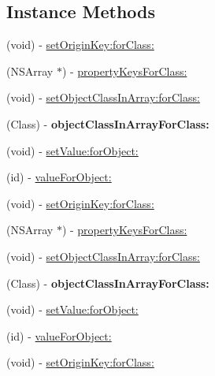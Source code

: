 \subsection*{Instance Methods}
\begin{DoxyCompactItemize}
\item 
(void) -\/ \mbox{\hyperlink{interface_m_j_property_ab05736d1d7501a6c7b686809bcd49a1c}{set\+Origin\+Key\+:for\+Class\+:}}
\item 
(N\+S\+Array $\ast$) -\/ \mbox{\hyperlink{interface_m_j_property_a0bb60a4e43e9c08eb17f9711c3313690}{property\+Keys\+For\+Class\+:}}
\item 
(void) -\/ \mbox{\hyperlink{interface_m_j_property_a79178c65fd4d34bdf5199bc7775ae5cd}{set\+Object\+Class\+In\+Array\+:for\+Class\+:}}
\item 
\mbox{\label{interface_m_j_property_ad41010eb106e4b2cd772da61abacad62}} 
(Class) -\/ {\bfseries object\+Class\+In\+Array\+For\+Class\+:}
\item 
(void) -\/ \mbox{\hyperlink{interface_m_j_property_a8d2eda5c6273d8346ac9de23a213afd2}{set\+Value\+:for\+Object\+:}}
\item 
(id) -\/ \mbox{\hyperlink{interface_m_j_property_aa7eac0780c2023f169f6194d9e5f66ab}{value\+For\+Object\+:}}
\item 
(void) -\/ \mbox{\hyperlink{interface_m_j_property_ab05736d1d7501a6c7b686809bcd49a1c}{set\+Origin\+Key\+:for\+Class\+:}}
\item 
(N\+S\+Array $\ast$) -\/ \mbox{\hyperlink{interface_m_j_property_a0bb60a4e43e9c08eb17f9711c3313690}{property\+Keys\+For\+Class\+:}}
\item 
(void) -\/ \mbox{\hyperlink{interface_m_j_property_a79178c65fd4d34bdf5199bc7775ae5cd}{set\+Object\+Class\+In\+Array\+:for\+Class\+:}}
\item 
\mbox{\label{interface_m_j_property_ad41010eb106e4b2cd772da61abacad62}} 
(Class) -\/ {\bfseries object\+Class\+In\+Array\+For\+Class\+:}
\item 
(void) -\/ \mbox{\hyperlink{interface_m_j_property_a8d2eda5c6273d8346ac9de23a213afd2}{set\+Value\+:for\+Object\+:}}
\item 
(id) -\/ \mbox{\hyperlink{interface_m_j_property_aa7eac0780c2023f169f6194d9e5f66ab}{value\+For\+Object\+:}}
\item 
(void) -\/ \mbox{\hyperlink{interface_m_j_property_ab05736d1d7501a6c7b686809bcd49a1c}{set\+Origin\+Key\+:for\+Class\+:}}

\end{DoxyCompactItemize}
